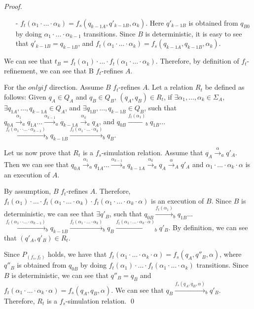\begin {proof}
\begin{itemize}
$\ldots$

\item[-] $f_t(\alpha_1 \cdot \ldots \cdot \alpha_k) = f_s(q_{k-1A},q'_{k-1B},\alpha_k)$. Here $q'_{k-1B}$ is obtained from $q_{B0}$ by doing $\alpha_1 \cdot \ldots \cdot \alpha_{k-1}$ transitions. Since $B$ is deterministic, it is easy to see that $q'_{k-1B} = q_{k-1B}$, and $f_t(\alpha_1 \cdot \ldots \cdot \alpha_k) = f_s(q_{k-1A},q_{k-1B},\alpha_k)$.
\end{itemize}

We can see that $t_B = f_t(\alpha_1) \cdot \ldots \cdot f_t(\alpha_1 \cdot \ldots \cdot \alpha_k)$. Therefore, by definition of $f_t$-refinement, we can see that B $f_t$-refines $A$.


For the $\mathit{only if}$ direction. Assume $B$ $f_t$-refines $A$. Let a relation $R_t$ be defined as follows: Given $q_A \in Q_A$ and $q_B \in Q_B$, $(q_A,q_B) \in R_t$, if $\exists \alpha_1, \ldots, \alpha_k \in \Sigma_A$, $\exists q_{1A},\ldots,q_{k-1A} \in Q_A$, and $\exists q_{1B},\ldots,q_{k-1B} \in Q_B$, such that $q_{0A} {\xrightarrow{\alpha_1}}_a q_{1A} \ldots {\xrightarrow{\alpha_{k-1}}}_a q_{k-1A} {\xrightarrow{\alpha_k}}_a q_A$, and $q_{0B} {\xrightarrow{f_t(\alpha_1)}}_b q_{1B} \ldots$ ${\xrightarrow{f_t(\alpha_1 \cdot \cdot \ldots \cdot \alpha_{k-1})}}_b q_{k-1B} {\xrightarrow{f_t(\alpha_1 \cdot \ldots \cdot \alpha_k)}}_b q_B$.

Let us now prove that $R_t$ is a $f_s$-simulation relation. Assume that $q_A {\xrightarrow{\alpha}}_a q'_A$. Then we can see that $q_{0A} {\xrightarrow{\alpha_1}}_a q_{1A} \ldots {\xrightarrow{\alpha_{k-1}}}_a q_{k-1A} {\xrightarrow{\alpha_k}}_a q_A {\xrightarrow{\alpha}}_A q'_A$ and $\alpha_1 \cdot \ldots \cdot \alpha_k \cdot \alpha$ is an execution of $A$.

By assumption, $B$ $f_t$-refines $A$. Therefore, $f_t(\alpha_1) \cdot \ldots \cdot f_t(\alpha_1 \cdot \ldots \cdot \alpha_k) \cdot f_t(\alpha_1 \cdot \ldots \cdot \alpha_k \cdot \alpha)$ is an execution of $B$. Since $B$ is deterministic, we can see that $\exists q'_B$, such that $q_{0B} {\xrightarrow{f_t(\alpha_1)}}_b q_{1B} \ldots$ ${\xrightarrow{f_t(\alpha_1 \cdot \cdot \ldots \cdot \alpha_{k-1})}}_b q_{k-1B} {\xrightarrow{f_t(\alpha_1 \cdot \ldots \cdot \alpha_k)}}_b q_B {\xrightarrow{f_t(\alpha_1 \cdot \ldots \cdot \alpha_k \cdot \alpha)}}_b q'_B$. By definition, we can see that $(q'_A,q'_B) \in R_t$.

Since $P_{(f_s,f_t)}$ holds, we have that $f_t(\alpha_1 \cdot \ldots \cdot \alpha_k \cdot \alpha) = f_s(q_A,q''_B,\alpha)$, where $q''_B$ is obtained from $q_{0B}$ by doing $f_t(\alpha_1) \cdot \ldots \cdot f_t(\alpha_1 \cdot \ldots \cdot \alpha_k)$ transitions. Since $B$ is deterministic, we can see that $q''_B = q_B$ and $f_t(\alpha_1 \cdot \ldots \cdot \alpha_k \cdot \alpha) = f_s(q_A,q_B,\alpha)$. We can see that $q_B {\xrightarrow{f_s(q_A,q_B,\alpha)}}_b q'_B$. Therefore, $R_t$ is a $f_s$-simulation relation. \qed
\end {proof}

